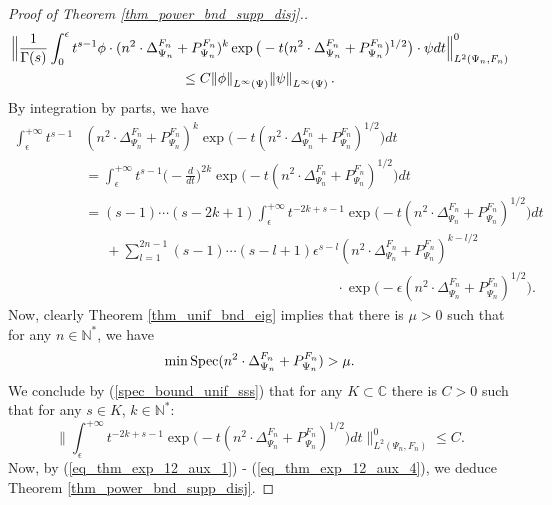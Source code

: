 \documentclass[12pt]{article}
\numberwithin{equation}{section}
\theoremstyle{theorem}
\theoremstyle{definition}
\theoremstyle{remark}
\newcommand{\comp}{\mathbb{C}}
\newcommand{\nat}{\mathbb{N}}
\newcommand{\spec}{{\rm{Spec}}}
\newcommand{\laplcomp}{\Delta}
\begin{document}
\begin{proof}[Proof of Theorem \ref{thm_power_bnd_supp_disj}.]
		\begin{multline}\label{eq_thm_exp_12_aux_2}
			\Big\|
			\frac{1}{\Gamma(s)}
			\int_0^{\epsilon} t^{s-1} \phi \cdot (n^2 \cdot\laplcomp_{\Psi_n}^{F_n} + P_{\Psi_n}^{F_n})^{k} \exp \big(-t (n^2 \cdot\laplcomp_{\Psi_n}^{F_n} + P_{\Psi_n}^{F_n})^{1/2} \big) \cdot \psi dt
			\Big\|_{L^2(\Psi_n, F_n)}^{0} 
			\\
			\leq 
			C  \norm{\phi}_{L^{\infty}(\Psi)} \norm{\psi}_{L^{\infty}(\Psi)}.
		\end{multline}
		By integration by parts, we have
		\begin{equation}\label{eq_thm_exp_12_aux_3}
		\begin{aligned}
			\int_{\epsilon}^{+\infty} t^{s-1} & (n^2 \cdot\laplcomp_{\Psi_n}^{F_n} + P_{\Psi_n}^{F_n})^{k} \exp \big(-t (n^2 \cdot\laplcomp_{\Psi_n}^{F_n} + P_{\Psi_n}^{F_n})^{1/2} \big) dt
			\\
			&			
			=
			\int_{\epsilon}^{+\infty} t^{s-1} \Big(- \frac{d}{dt}  \Big)^{2k} \exp \big(-t (n^2 \cdot\laplcomp_{\Psi_n}^{F_n} + P_{\Psi_n}^{F_n})^{1/2} \big) dt
			\\
			&
			=
			(s - 1) \cdots (s - 2k + 1)
			\int_{\epsilon}^{+\infty} t^{-2k + s - 1} \exp \big(-t (n^2 \cdot\laplcomp_{\Psi_n}^{F_n} + P_{\Psi_n}^{F_n})^{1/2} \big) dt
			\\
			&
			\phantom{= \,}
			+
			\sum_{l = 1}^{2n - 1} (s-1) \cdots (s - l + 1) \epsilon^{s - l} (n^2 \cdot\laplcomp_{\Psi_n}^{F_n} + P_{\Psi_n}^{F_n})^{k - l/2}
			\\
			&
			\qquad \qquad \qquad \qquad \qquad \qquad \qquad \qquad \qquad
			\cdot
			\exp \big(-\epsilon (n^2 \cdot\laplcomp_{\Psi_n}^{F_n} + P_{\Psi_n}^{F_n})^{1/2} \big).
		\end{aligned}
		\end{equation}
		Now, clearly Theorem \ref{thm_unif_bnd_eig} implies that there is $\mu > 0$ such that for any $n \in \nat^*$, we have
		\begin{equation}\label{spec_bound_unif_sss}
			\min \spec (n^2 \cdot\laplcomp_{\Psi_n}^{F_n} + P_{\Psi_n}^{F_n}) > \mu.
		\end{equation}
		We conclude by (\ref{spec_bound_unif_sss}) that for any $K \subset \comp$ there is $C > 0$ such that for any $s \in K$, $k \in \nat^*$:
		\begin{equation}\label{eq_thm_exp_12_aux_4}
			\Big\|
				\int_{\epsilon}^{+\infty} t^{-2k + s - 1} \exp \big(-t (n^2 \cdot\laplcomp_{\Psi_n}^{F_n} + P_{\Psi_n}^{F_n})^{1/2} \big) dt
			\Big\|_{L^2(\Psi_n, F_n)}^{0} 
			\leq 
			C.
		\end{equation}
		Now, by (\ref{eq_thm_exp_12_aux_1}) - (\ref{eq_thm_exp_12_aux_4}), we deduce Theorem \ref{thm_power_bnd_supp_disj}. 
	\end{proof}
\end{document}
